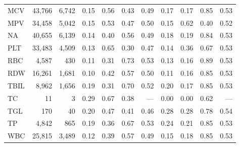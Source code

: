 \begin{table}[ht]
\begin{tabular}{lrrrrrrrrrr}
MCV & 43,766 & 6,742 & 0.15 & 0.56 & 0.43 & 0.49 & 0.17 & 0.17 & 0.85 & 0.53 \\
MPV & 34,458 & 5,042 & 0.15 & 0.53 & 0.47 & 0.50 & 0.15 & 0.62 & 0.40 & 0.52 \\
NA & 40,655 & 6,139 & 0.14 & 0.40 & 0.56 & 0.49 & 0.18 & 0.19 & 0.84 & 0.53 \\
PLT & 33,483 & 4,509 & 0.13 & 0.65 & 0.30 & 0.47 & 0.14 & 0.36 & 0.67 & 0.53 \\
RBC & 4,587 & 430 & 0.11 & 0.31 & 0.73 & 0.53 & 0.13 & 0.16 & 0.89 & 0.53 \\
RDW & 16,261 & 1,681 & 0.10 & 0.42 & 0.57 & 0.50 & 0.11 & 0.16 & 0.85 & 0.53 \\
TBIL & 8,962 & 1,656 & 0.19 & 0.31 & 0.70 & 0.52 & 0.20 & 0.17 & 0.85 & 0.53 \\
TC & 11 & 3 & 0.29 & 0.67 & 0.38 & --- & 0.00 & 0.00 & 0.62 & --- \\
TGL & 170 & 40 & 0.20 & 0.47 & 0.41 & 0.46 & 0.28 & 0.28 & 0.78 & 0.54 \\
TP & 4,842 & 865 & 0.19 & 0.36 & 0.67 & 0.53 & 0.24 & 0.21 & 0.85 & 0.53 \\
WBC & 25,815 & 3,489 & 0.12 & 0.39 & 0.57 & 0.49 & 0.15 & 0.18 & 0.85 & 0.53 \\
\bottomrule
\end{tabular}
\label{tab:12_eval_detail_eicu_aki}
\end{table}